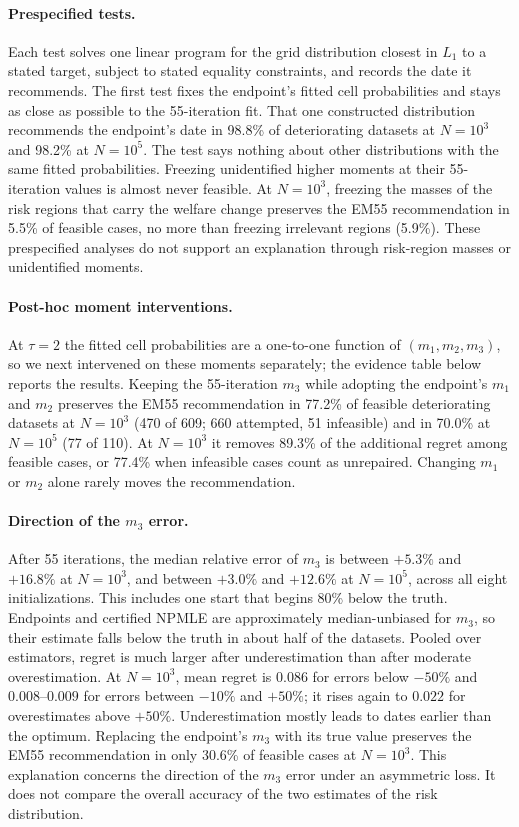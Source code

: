 \paragraph{Prespecified tests.}
Each test solves one linear program for the grid distribution closest in
$L_1$ to a stated target, subject to stated equality constraints, and records
the date it recommends.  The first test fixes the endpoint's fitted cell
probabilities and stays as close as possible to the 55-iteration fit.  That
one constructed distribution recommends the endpoint's date in 98.8\% of
deteriorating datasets at $N=10^3$ and 98.2\% at $N=10^5$.  The test says
nothing about other distributions with the same fitted probabilities.
Freezing unidentified higher moments at their 55-iteration values is almost
never feasible.  At $N=10^3$, freezing the masses of the risk regions that
carry the welfare change preserves the EM55 recommendation in 5.5\% of
feasible cases, no more than freezing irrelevant regions (5.9\%).  These
prespecified analyses do not support an explanation through risk-region
masses or unidentified moments.

\paragraph{Post-hoc moment interventions.}
At $\tau=2$ the fitted cell probabilities are a one-to-one function of
$(m_1,m_2,m_3)$, so we next intervened on these moments separately; the
evidence table below reports the results.  Keeping the 55-iteration $m_3$
while adopting the endpoint's $m_1$ and $m_2$ preserves the EM55
recommendation in 77.2\% of feasible deteriorating datasets at $N=10^3$ (470
of 609; 660 attempted, 51 infeasible) and in 70.0\% at $N=10^5$ (77 of 110).
At $N=10^3$ it removes 89.3\% of the additional regret among feasible cases,
or 77.4\% when infeasible cases count as unrepaired.  Changing $m_1$ or $m_2$
alone rarely moves the recommendation.

\paragraph{Direction of the $m_3$ error.}
After 55 iterations, the median relative error of $m_3$ is between $+5.3\%$
and $+16.8\%$ at $N=10^3$, and between $+3.0\%$ and $+12.6\%$ at $N=10^5$,
across all eight initializations.  This includes one start that begins 80\%
below the truth.  Endpoints and certified NPMLE are approximately
median-unbiased for $m_3$, so their estimate falls below the truth in about
half of the datasets.  Pooled over estimators, regret is much larger after
underestimation than after moderate overestimation.  At $N=10^3$, mean regret
is $0.086$ for errors below $-50\%$ and $0.008$--$0.009$ for errors between
$-10\%$ and $+50\%$; it rises again to $0.022$ for overestimates above
$+50\%$.  Underestimation mostly leads to dates earlier than the optimum.
Replacing the endpoint's $m_3$ with its true value preserves the EM55
recommendation in only 30.6\% of feasible cases at $N=10^3$.  This
explanation concerns the direction of the $m_3$ error under an asymmetric
loss.  It does not compare the overall accuracy of the two estimates of the
risk distribution.

